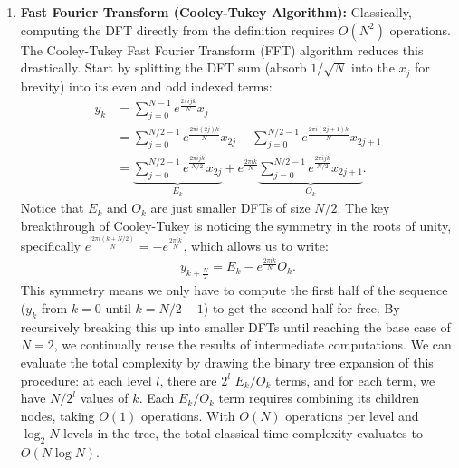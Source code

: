 \begin{enumerate}
    \item \textbf{Fast Fourier Transform (Cooley-Tukey Algorithm):}
    Classically, computing the DFT directly from the definition requires $O(N^2)$ operations. The Cooley-Tukey Fast Fourier Transform (FFT) algorithm reduces this drastically. 
    Start by splitting the DFT sum (absorb $1/\sqrt{N}$ into the $x_j$ for brevity) into its even and odd indexed terms:
    \begin{align*}
        y_k &= \sum_{j=0}^{N-1} e^{\frac{2\pi i jk}{N}} x_j\\
        &= \sum_{j=0}^{N/2-1} e^{\frac{2\pi i (2j)k}{N}} x_{2j} + \sum_{j=0}^{N/2-1} e^{\frac{2\pi i (2j+1)k}{N}} x_{2j+1}\\
        &= \underbrace{\sum_{j=0}^{N/2-1} e^{\frac{2\pi i jk}{N/2}} x_{2j}}_{E_k} + e^{\frac{2\pi ik}{N}}\underbrace{\sum_{j=0}^{N/2-1} e^{\frac{2\pi i jk}{N/2}} x_{2j+1}}_{O_k}.
    \end{align*}
    Notice that $E_k$ and $O_k$ are just smaller DFTs of size $N/2$. The key breakthrough of Cooley-Tukey is noticing the symmetry in the roots of unity, specifically $e^{\frac{2\pi i(k+N/2)}{N}} = -e^{\frac{2\pi ik}{N}}$, which allows us to write:
    \begin{align*}
        y_{k+\frac{N}{2}} = E_k - e^{\frac{2\pi ik}{N}}O_k.
    \end{align*}
    This symmetry means we only have to compute the first half of the sequence ($y_k$ from $k=0$ until $k=N/2-1$) to get the second half for free. By recursively breaking this up into smaller DFTs until reaching the base case of $N=2$, we continually reuse the results of intermediate computations. We can evaluate the total complexity by drawing the binary tree expansion of this procedure: at each level $l$, there are $2^l$ $E_k/O_k$ terms, and for each term, we have $N/2^l$ values of $k$. Each $E_k/O_k$ term requires combining its children nodes, taking $O(1)$ operations. With $O(N)$ operations per level and $\log_2 N$ levels in the tree, the total classical time complexity evaluates to $O(N \log N)$.


\end{enumerate}
